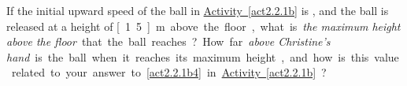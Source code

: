 \label{fnt2.2.1-1}

If the initial upward speed of the ball in \hyperref[act2.2.1b]{Activity~\ref*{act2.2.1b}} is , and the ball is released at a height of \unit[1.5]{m} above the floor, what is {\em the maximum height above the floor} that the ball reaches? How far \emph{above Christine's hand} is the ball when it reaches its maximum height, and how is this value related to your answer to \hyperref[act2.2.1b4]{\ref*{act2.2.1b4}} in \hyperref[act2.2.1b]{Activity~\ref*{act2.2.1b}}?